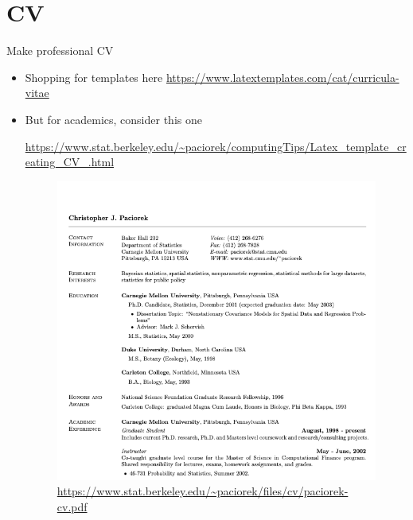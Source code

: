 \documentclass[
11pt, %
]{beamer}
\begin{document}
	\section{CV}
	\begin{frame}{Make professional CV}
		\begin{itemize}
		\item Shopping for templates here \url{https://www.latextemplates.com/cat/curricula-vitae}
		
		\item But for academics, consider this one
		
		\url{https://www.stat.berkeley.edu/~paciorek/computingTips/Latex_template_creating_CV_.html}
		\begin{figure}[ht]
			\includegraphics[scale=0.15]{cv_example.png}
			\caption{\tiny \url{https://www.stat.berkeley.edu/~paciorek/files/cv/paciorek-cv.pdf} }
		\end{figure}
		\end{itemize}
	\end{frame}
	
\end{document}
